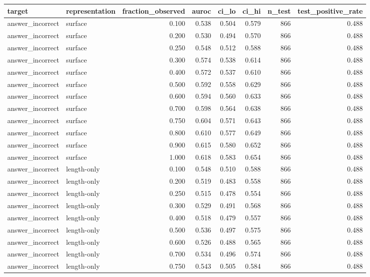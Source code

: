 \begin{tabular}{llrrrrrr}
\toprule
target & representation & fraction_observed & auroc & ci_lo & ci_hi & n_test & test_positive_rate \\
\midrule
answer_incorrect & surface & 0.100 & 0.538 & 0.504 & 0.579 & 866 & 0.488 \\
answer_incorrect & surface & 0.200 & 0.530 & 0.494 & 0.570 & 866 & 0.488 \\
answer_incorrect & surface & 0.250 & 0.548 & 0.512 & 0.588 & 866 & 0.488 \\
answer_incorrect & surface & 0.300 & 0.574 & 0.538 & 0.614 & 866 & 0.488 \\
answer_incorrect & surface & 0.400 & 0.572 & 0.537 & 0.610 & 866 & 0.488 \\
answer_incorrect & surface & 0.500 & 0.592 & 0.558 & 0.629 & 866 & 0.488 \\
answer_incorrect & surface & 0.600 & 0.594 & 0.560 & 0.633 & 866 & 0.488 \\
answer_incorrect & surface & 0.700 & 0.598 & 0.564 & 0.638 & 866 & 0.488 \\
answer_incorrect & surface & 0.750 & 0.604 & 0.571 & 0.643 & 866 & 0.488 \\
answer_incorrect & surface & 0.800 & 0.610 & 0.577 & 0.649 & 866 & 0.488 \\
answer_incorrect & surface & 0.900 & 0.615 & 0.580 & 0.652 & 866 & 0.488 \\
answer_incorrect & surface & 1.000 & 0.618 & 0.583 & 0.654 & 866 & 0.488 \\
answer_incorrect & length-only & 0.100 & 0.548 & 0.510 & 0.588 & 866 & 0.488 \\
answer_incorrect & length-only & 0.200 & 0.519 & 0.483 & 0.558 & 866 & 0.488 \\
answer_incorrect & length-only & 0.250 & 0.515 & 0.478 & 0.554 & 866 & 0.488 \\
answer_incorrect & length-only & 0.300 & 0.529 & 0.491 & 0.568 & 866 & 0.488 \\
answer_incorrect & length-only & 0.400 & 0.518 & 0.479 & 0.557 & 866 & 0.488 \\
answer_incorrect & length-only & 0.500 & 0.536 & 0.497 & 0.575 & 866 & 0.488 \\
answer_incorrect & length-only & 0.600 & 0.526 & 0.488 & 0.565 & 866 & 0.488 \\
answer_incorrect & length-only & 0.700 & 0.534 & 0.496 & 0.574 & 866 & 0.488 \\
answer_incorrect & length-only & 0.750 & 0.543 & 0.505 & 0.584 & 866 & 0.488 \\

\end{tabular}
